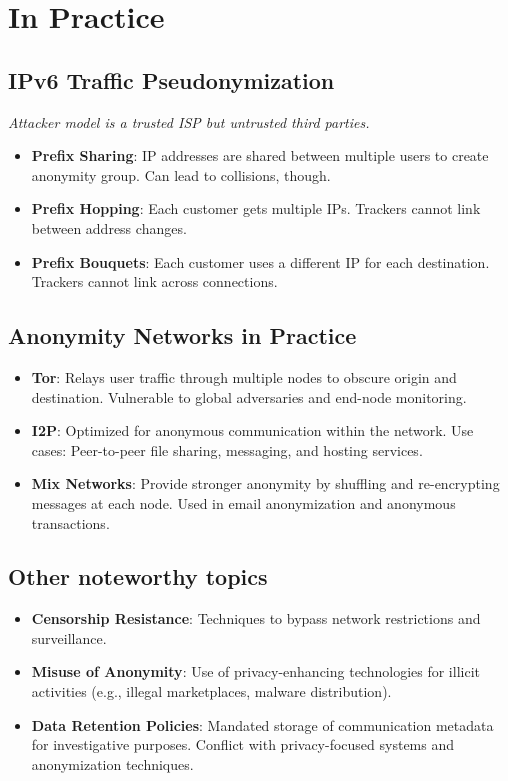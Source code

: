 \documentclass{article}
\begin{document}

\section{In Practice}

\subsection{IPv6 Traffic Pseudonymization}
\textit{Attacker model is a trusted ISP but untrusted third parties.}
\begin{itemize}
  \item \textbf{Prefix Sharing}: IP addresses are shared between multiple users to create anonymity group. Can lead to collisions, though.
  \item \textbf{Prefix Hopping}: Each customer gets multiple IPs. Trackers cannot link between address changes.
  \item \textbf{Prefix Bouquets}: Each customer uses a different IP for each destination. Trackers cannot link across connections.
\end{itemize}

\subsection{Anonymity Networks in Practice}
\begin{itemize}
  \item \textbf{Tor}: Relays user traffic through multiple nodes to obscure origin and destination. Vulnerable to global adversaries and end-node monitoring.
  \item \textbf{I2P}: Optimized for anonymous communication within the network. Use cases: Peer-to-peer file sharing, messaging, and hosting services.
  \item \textbf{Mix Networks}: Provide stronger anonymity by shuffling and re-encrypting messages at each node. Used in email anonymization and anonymous transactions.
\end{itemize}
\subsection{Other noteworthy topics}
\begin{itemize}
  \item \textbf{Censorship Resistance}: Techniques to bypass network restrictions and surveillance.
  \item \textbf{Misuse of Anonymity}: Use of privacy-enhancing technologies for illicit activities (e.g., illegal marketplaces, malware distribution).
  \item \textbf{Data Retention Policies}: Mandated storage of communication metadata for investigative purposes. Conflict with privacy-focused systems and anonymization techniques.
\end{itemize}
\end{document}
